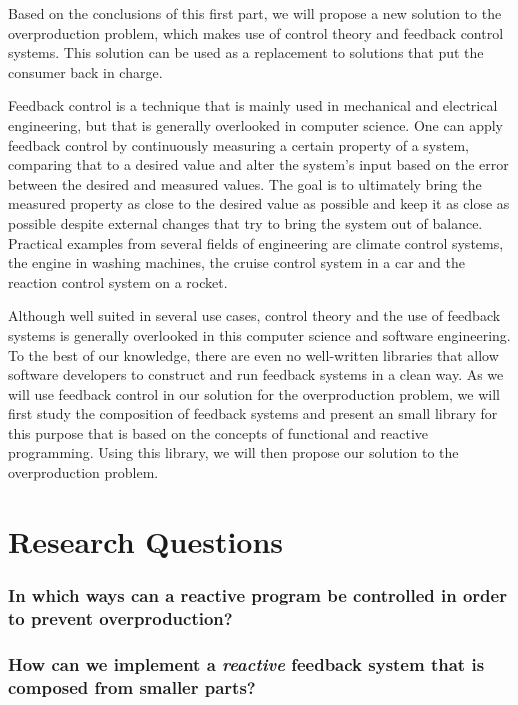 Based on the conclusions of this first part, we will propose a new solution to the overproduction problem, which makes use of control theory and feedback control systems. This solution can be used as a replacement to solutions that put the consumer back in charge.

Feedback control is a technique that is mainly used in mechanical and electrical engineering, but that is generally overlooked in computer science. One can apply feedback control by continuously measuring a certain property of a system, comparing that to a desired value and alter the system's input based on the error between the desired and measured values. The goal is to ultimately bring the measured property as close to the desired value as possible and keep it as close as possible despite external changes that try to bring the system out of balance.  Practical examples from several fields of engineering are climate control systems, the engine in washing machines, the cruise control system in a car and the reaction control system on a rocket.

Although well suited in several use cases, control theory and the use of feedback systems is generally overlooked in this computer science and software engineering. To the best of our knowledge, there are even no well-written libraries that allow software developers to construct and run feedback systems in a clean way. As we will use feedback control in our solution for the overproduction problem, we will first study the composition of feedback systems and present an small library for this purpose that is based on the concepts of functional and reactive programming. Using this library, we will then propose our solution to the overproduction problem.

\section*{Research Questions}

\subsubsection*{In which ways can a reactive program be controlled in order to prevent overproduction?}

\subsubsection*{How can we implement a \emph{reactive} feedback system that is composed from smaller parts?} 

